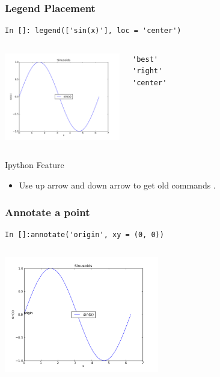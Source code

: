 \documentclass[14pt,compress]{beamer}
\begin{document}
\begin{frame}[fragile]
\frametitle{Legend Placement}
\begin{block}{}
    \small
\begin{lstlisting}
In []: legend(['sin(x)'], loc = 'center')
\end{lstlisting}
\end{block}

\begin{columns}
 \includegraphics[height=1.5in, interpolate=true]{data/position}  
\vspace{-0.15in}
\begin{lstlisting}
'best' 
'right'
'center'
\end{lstlisting}
\end{columns}
\begin{block}{Ipython Feature}
    \begin{itemize}
      \item Use up arrow and down arrow to get old commands .
  \end{itemize}
  \end{block}

\end{frame}



\begin{frame}[fragile]
\frametitle{Annotate a point }

\begin{lstlisting}
In []:annotate('origin', xy = (0, 0))
\end{lstlisting}


\begin{columns}
 \includegraphics[height=2in, interpolate=true]{data/annotate}  
\vspace{-0.2in}
\end{columns}
\end{frame}
\end{document}
